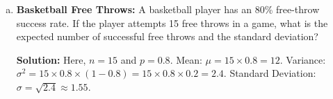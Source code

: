 \documentclass{article}
\begin{document}
\begin{enumerate}
\begin{enumerate}[a)]
        \item \textbf{Basketball Free Throws:} A basketball player has an 80\% free-throw success rate. If the player attempts 15 free throws in a game, what is the expected number of successful free throws and the standard deviation?
        
        \textbf{Solution:} Here, $n=15$ and $p=0.8$.
        Mean: $\mu = 15 \times 0.8 = 12$.
        Variance: $\sigma^2 = 15 \times 0.8 \times (1-0.8) = 15 \times 0.8 \times 0.2 = 2.4$.
        Standard Deviation: $\sigma = \sqrt{2.4} \approx 1.55$.
    \end{enumerate}
\end{enumerate}
\end{document}
